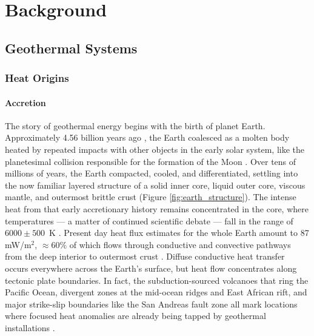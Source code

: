 \chapter{Background}\label{ch2:background}

\section{Geothermal Systems}\label{ch2:geosys}
\subsection{Heat Origins}\label{ch2:heatorig}
\subsubsection{Accretion}\label{ch2:accrete}
The story of geothermal energy begins with the birth of planet Earth. Approximately 4.56 billion years ago \citep{allegre_age_1995, patterson_age_1956}, the Earth coalesced as a molten body heated by repeated impacts with other objects in the early solar system, like the planetesimal collision responsible for the formation of the Moon \citep{stevenson_origin_2014}. Over tens of millions of years, the Earth compacted, cooled, and differentiated, settling into the now familiar layered structure of a solid inner core, liquid outer core, viscous mantle, and outermost brittle crust \citep[p.\ 7]{press_understanding_2004} (Figure \ref{fig:earth_structure}). The intense heat from that early accretionary history remains concentrated in the core, where temperatures --- a matter of continued scientific debate --- fall in the range of $6000\pm500$~K \citep[p.\ 372]{fowler_solid_2005}. Present day heat flux estimates for the whole Earth amount to 87 mW/m$^2$, $\approx 60\%$ of which flows through conductive and convective pathways from the deep interior to outermost crust \citep{stein_heat_1995}. Diffuse conductive heat transfer occurs everywhere across the Earth’s surface, but heat flow concentrates along tectonic plate boundaries. In fact, the subduction-sourced volcanoes that ring the Pacific Ocean, divergent zones at the mid-ocean ridges and East African rift, and major strike-slip boundaries like the San Andreas fault zone all mark locations where focused heat anomalies are already being tapped by geothermal installations \citep[p.\ 16]{dipippo_geothermal_2012}.

